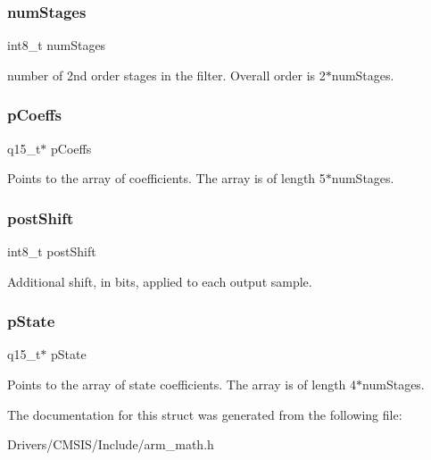 \subsubsection{\texorpdfstring{num\+Stages}{numStages}}
{\footnotesize\ttfamily int8\+\_\+t num\+Stages}

number of 2nd order stages in the filter. Overall order is 2$\ast$num\+Stages. \mbox{\label{structarm__biquad__casd__df1__inst__q15_a7ca181a37f714d174445f486bebce26f}} 
\subsubsection{\texorpdfstring{p\+Coeffs}{pCoeffs}}
{\footnotesize\ttfamily q15\+\_\+t$\ast$ p\+Coeffs}

Points to the array of coefficients. The array is of length 5$\ast$num\+Stages. \mbox{\label{structarm__biquad__casd__df1__inst__q15_a3603cbf084938b6931bcb05dfe487f09}} 
\subsubsection{\texorpdfstring{post\+Shift}{postShift}}
{\footnotesize\ttfamily int8\+\_\+t post\+Shift}

Additional shift, in bits, applied to each output sample. \mbox{\label{structarm__biquad__casd__df1__inst__q15_ae29dfdb736374fcddaeaec4b7770170c}} 
\subsubsection{\texorpdfstring{p\+State}{pState}}
{\footnotesize\ttfamily q15\+\_\+t$\ast$ p\+State}

Points to the array of state coefficients. The array is of length 4$\ast$num\+Stages. 

The documentation for this struct was generated from the following file\+:\begin{DoxyCompactItemize}
\item 
Drivers/\+C\+M\+S\+I\+S/\+Include/arm\+\_\+math.\+h\end{DoxyCompactItemize}
